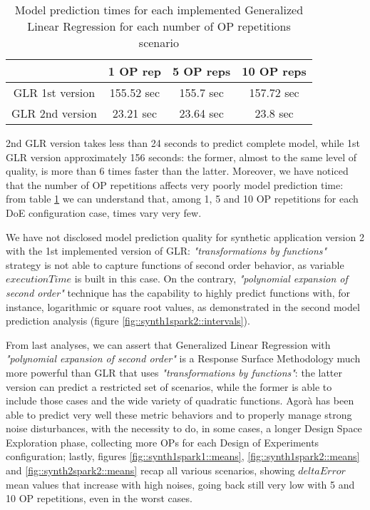\begin{table}[h]

    \centering
    
    \begin{tabular}{cccc}
    
        \toprule
         & 1 OP rep & 5 OP reps & 10 OP reps \\
        \midrule
        GLR 1st version & 155.52 sec & 155.7 sec & 157.72 sec \\
        GLR 2nd version & 23.21 sec & 23.64 sec & 23.8 sec \\
        \bottomrule 
    
    \end{tabular}

    \caption{Model prediction times for each implemented Generalized Linear Regression for each number of OP repetitions scenario}
    \label{tab::GLRtimes}
    
\end{table}

2nd GLR version takes less than 24 seconds to predict complete model, while 1st GLR version approximately 156 seconds: the former, almost to the same level of quality, is more than 6 times faster than the latter. Moreover, we have noticed that the number of OP repetitions affects very poorly model prediction time: from table \ref{tab::GLRtimes} we can understand that, among 1, 5 and 10 OP repetitions for each DoE configuration case, times vary very few.

We have not disclosed model prediction quality for synthetic application version 2 with the 1st implemented version of GLR: \textit{"transformations by functions"} strategy is not able to capture functions of second order behavior, as variable $executionTime$ is built in this case. On the contrary, \textit{"polynomial expansion of second order"} technique has the capability to highly predict functions with, for instance, logarithmic or square root values, as demonstrated in the second model prediction analysis (figure \ref{fig::synth1spark2::intervals}).

From last analyses, we can assert that Generalized Linear Regression with \textit{"polynomial expansion of second order"} is a Response Surface Methodology much more powerful than GLR that uses \textit{"transformations by functions"}: the latter version can predict a restricted set of scenarios, while the former is able to include those cases and the wide variety of quadratic functions. Agorà has been able to predict very well these metric behaviors and to properly manage strong noise disturbances, with the necessity to do, in some cases, a longer Design Space Exploration phase, collecting more OPs for each Design of Experiments configuration; lastly, figures \ref{fig::synth1spark1::means}, \ref{fig::synth1spark2::means} and \ref{fig::synth2spark2::means} recap all various scenarios, showing $deltaError$ mean values that increase with high noises, going back still very low with 5 and 10 OP repetitions, even in the worst cases.


